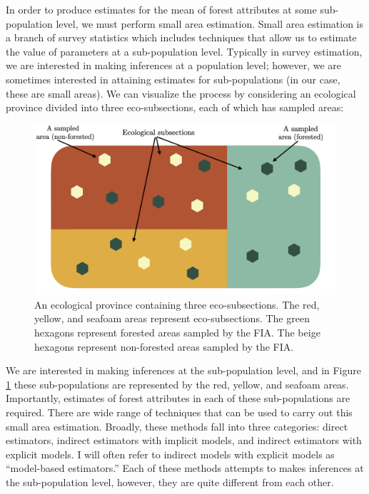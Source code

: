 \documentclass[12pt,twoside]{reedthesis}
\begin{document}
In order to produce estimates for the mean of forest attributes at some sub-population level, we must perform small area estimation. Small area estimation is a branch of survey statistics which includes techniques that allow us to estimate the value of parameters at a sub-population level. Typically in survey estimation, we are interested in making inferences at a population level; however, we are sometimes interested in attaining estimates for sub-populations (in our case, these are small areas). We can visualize the process by considering an ecological province divided into three eco-subsections, each of which has sampled areas:
\begin{figure}

{\centering \includegraphics[width=1\linewidth]{figure/ecoprov-diagram} 

}

\caption[An ecological province]{An ecological province containing three eco-subsections. The red, yellow, and seafoam areas represent eco-subsections. The green hexagons represent forested areas sampled by the FIA. The beige hexagons represent non-forested areas sampled by the FIA.}\label{fig:ecological-province-diagram}
\end{figure}
We are interested in making inferences at the sub-population level, and in Figure \ref{fig:ecological-province-diagram} these sub-populations are represented by the red, yellow, and seafoam areas. Importantly, estimates of forest attributes in each of these sub-populations are required. There are wide range of techniques that can be used to carry out this small area estimation. Broadly, these methods fall into three categories: direct estimators, indirect estimators with implicit models, and indirect estimators with explicit models. I will often refer to indirect models with explicit models as ``model-based estimators.'' Each of these methods attempts to makes inferences at the sub-population level, however, they are quite different from each other.
\end{document}
